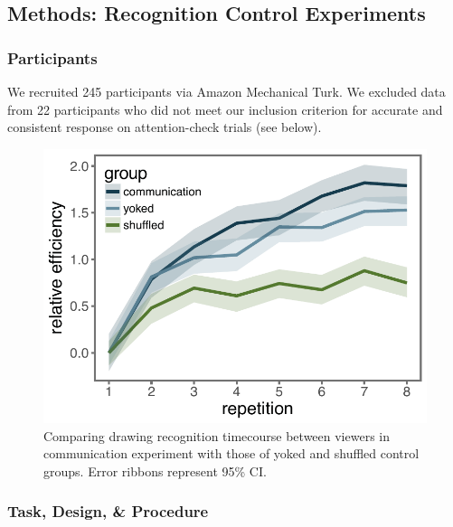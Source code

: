 \documentclass[10pt,letterpaper]{article}
\begin{document}
\subsection{Methods: Recognition Control Experiments}

\subsubsection{Participants}

We recruited 245 participants via Amazon Mechanical Turk.
We excluded data from 22 participants who did not meet our inclusion criterion for accurate and consistent response on attention-check trials (see below).

\begin{figure}[ht]
\begin{center}
\includegraphics[width=0.92 \linewidth]{figures/recog_BIS_timeseries.pdf}
\caption{Comparing drawing recognition timecourse between viewers in communication experiment with those of yoked and shuffled control groups. Error ribbons represent 95\% CI.}
\label{recog_bis}
\end{center}
\end{figure}


\subsubsection{Task, Design, \& Procedure}
\end{document}
